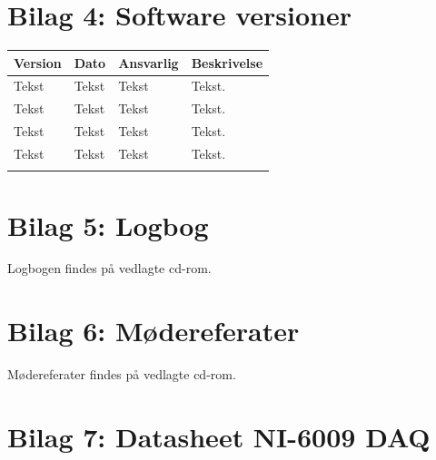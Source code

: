 \clearpage


\section{Bilag 4: Software versioner}\label{bilag4}
\begin{longtabu} to 
    Version &    Dato &    Ansvarlig &    Beskrivelse\\[-1ex]
    \midrule
    Tekst &    Tekst &    Tekst &    Tekst.\\
    Tekst &    Tekst &    Tekst &    Tekst.\\
    Tekst &    Tekst &    Tekst &    Tekst.\\
    Tekst &    Tekst &    Tekst &    Tekst.\\
\label{version_SW}
\end{longtabu}

\clearpage

\section{Bilag 5: Logbog}\label{bilag5}
Logbogen findes på vedlagte cd-rom.

\clearpage

\section{Bilag 6: Mødereferater}\label{bilag6}
Mødereferater findes på vedlagte cd-rom.

\clearpage

\section{Bilag 7: Datasheet NI-6009 DAQ}\label{bilag7}
